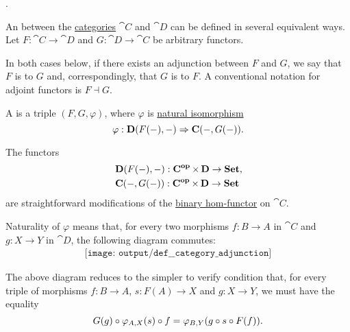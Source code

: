 \begin{definition}\label{def:category_adjunction}
  .

  An  between the \hyperref[def:category]{categories} \( \cat{C} \) and \( \cat{D} \) can be defined in several equivalent ways. Let \( F: \cat{C} \to \cat{D} \) and \( G: \cat{D} \to \cat{C} \) be arbitrary functors.

  In both cases below, if there exists an adjunction between \( F \) and \( G \), we say that \( F \) is  to \( G \) and, correspondingly, that \( G \) is  to \( F \). A conventional notation for adjoint functors is \( F \dashv G \).

  \begin{thmenum}
     A  is a triple \( (F, G, \varphi) \), where \( \varphi \) is \hyperref[thm:natural_isomorphism]{natural isomorphism}
    \begin{equation}\label{eq:def:category_adjunction/hom}
      \varphi: \cat{D}(F(\anon*), \anon*) \Rightarrow \cat{C}(\anon*, G(\anon*)).
    \end{equation}

    The functors
    \begin{align*}
      &\cat{D}(F(\anon*), \anon*): \cat{C}^\oppos \times \cat{D} \to \cat{Set}, \\
      &\cat{C}(\anon*, G(\anon*)): \cat{C}^\oppos \times \cat{D} \to \cat{Set}
    \end{align*}
    are straightforward modifications of the \hyperref[eq:def:hom_functor/binary]{binary hom-functor} on \( \cat{C} \).

    Naturality of \( \varphi \) means that, for every two morphisms \( f: B \to A \) in \( \cat{C} \) and \( g: X \to Y \) in \( \cat{D} \), the following diagram commutes:
    \begin{equation}\label{eq:def:category_adjunction/varphi_nat_diagram}
      \begin{aligned}
        \texttt{[image: output/def\_\_category\_adjunction]}
      \end{aligned}
    \end{equation}

    The above diagram reduces to the simpler to verify condition that, for every triple of morphisms \( f: B \to A \), \( s: F(A) \to X \) and \( g: X \to Y \), we must have the equality
    \begin{equation}\label{eq:def:category_adjunction/varphi_nat}
      G(g) \bincirc \varphi_{A,X}(s) \bincirc f = \varphi_{B,Y}(g \bincirc s \bincirc F(f)).
    \end{equation}


\end{thmenum}
\end{definition}
